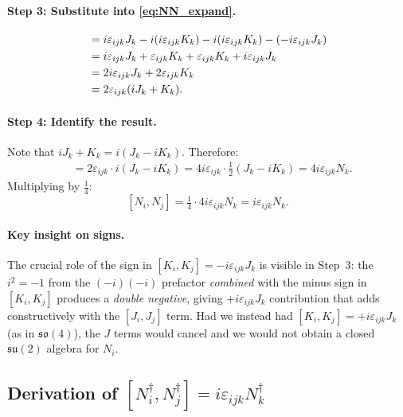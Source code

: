\documentclass[12pt]{article}
\theoremstyle{remark}
\begin{document}
\paragraph{Step 3: Substitute into \eqref{eq:NN_expand}.}
\begin{align}
  [J_i - iK_i,\; J_j - iK_j]
  &= i\varepsilon_{ijk}J_k
     - i(i\varepsilon_{ijk}K_k)
     - i(i\varepsilon_{ijk}K_k)
     - (-i\varepsilon_{ijk}J_k)
  \notag\\
  &= i\varepsilon_{ijk}J_k
     + \varepsilon_{ijk}K_k
     + \varepsilon_{ijk}K_k
     + i\varepsilon_{ijk}J_k
  \notag\\
  &= 2i\varepsilon_{ijk}J_k + 2\varepsilon_{ijk}K_k
  \notag\\
  &= 2\varepsilon_{ijk}(iJ_k + K_k).
  \label{eq:step3}
\end{align}

\paragraph{Step 4: Identify the result.}
Note that $iJ_k + K_k = i(J_k - iK_k)$. Therefore:
\begin{align}
  [J_i - iK_i,\; J_j - iK_j]
  &= 2\varepsilon_{ijk}\cdot i(J_k - iK_k)
   = 4i\varepsilon_{ijk}\cdot\tfrac{1}{2}(J_k - iK_k)
   = 4i\varepsilon_{ijk}N_k.
\end{align}
Multiplying by $\tfrac{1}{4}$:
\begin{equation}
  \boxed{[N_i, N_j] = \tfrac{1}{4}\cdot 4i\varepsilon_{ijk}N_k = i\varepsilon_{ijk}N_k.}
\end{equation}

\paragraph{Key insight on signs.}
The crucial role of the sign in $[K_i,K_j]=-i\varepsilon_{ijk}J_k$ is
visible in Step~3: the $i^2 = -1$ from the $(-i)(-i)$ prefactor
\emph{combined} with the minus sign in $[K_i,K_j]$
produces a \emph{double negative}, giving $+i\varepsilon_{ijk}J_k$
contribution that adds constructively with the $[J_i,J_j]$ term.
Had we instead had $[K_i,K_j]=+i\varepsilon_{ijk}J_k$
(as in $\mathfrak{so}(4)$), the $J$ terms would cancel and we would not
obtain a closed $\mathfrak{su}(2)$ algebra for $N_i$.

\subsection{Derivation of
  \texorpdfstring{$[N_i^\dagger,N_j^\dagger]=i\varepsilon_{ijk}N_k^\dagger$}%
    {[N†,N†]=iepsN†}}
\end{document}
